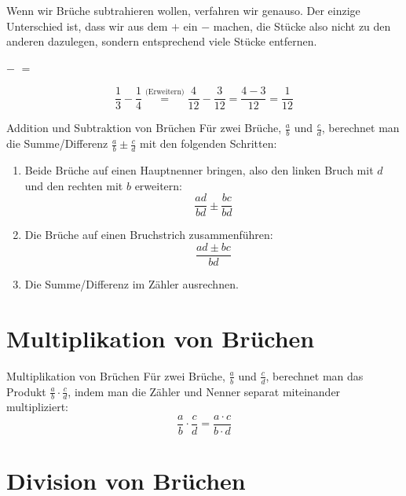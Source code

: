 \documentclass[../../main]{subfiles}
\begin{document}
Wenn wir Brüche subtrahieren wollen, verfahren wir genauso. Der einzige Unterschied ist, dass wir aus dem $+$ ein $-$ machen, die Stücke also nicht zu den anderen dazulegen, sondern entsprechend viele Stücke entfernen.
\begin{example}{}
$-$
$=$

\[\frac{1}{3}-\frac{1}{4}\ensuremath{\stackrel{\text{(Erweitern)}}{=}}\frac{4}{12}-\frac{3}{12}=\frac{4-3}{12}=\frac{1}{12}\]
\end{example}

\begin{theorem}{Addition und Subtraktion von Brüchen}
Für zwei Brüche, $\frac{a}{b}$ und $\frac{c}{d}$, berechnet man die Summe/Differenz $\frac{a}{b}\pm\frac{c}{d}$ mit den folgenden Schritten:
\begin{enumerate}
    \item Beide Brüche auf einen Hauptnenner bringen, also den linken Bruch mit $d$ und den rechten mit $b$ erweitern:\[\frac{ad}{bd}\pm\frac{bc}{bd}\]
    \item Die Brüche auf einen Bruchstrich zusammenführen:\[\frac{ad\pm bc}{bd}\]
    \item Die Summe/Differenz im Zähler ausrechnen.
\end{enumerate}
\end{theorem}

\section{Multiplikation von Brüchen}
\begin{theorem}{Multiplikation von Brüchen}
Für zwei Brüche, $\frac{a}{b}$ und $\frac{c}{d}$, berechnet man das Produkt $\frac{a}{b}\cdot\frac{c}{d}$, indem man die Zähler und Nenner separat miteinander multipliziert:
\[\frac{a}{b}\cdot\frac{c}{d}=\frac{a\cdot c}{b\cdot d}\]
\end{theorem}
\section{Division von Brüchen}
\end{document}
